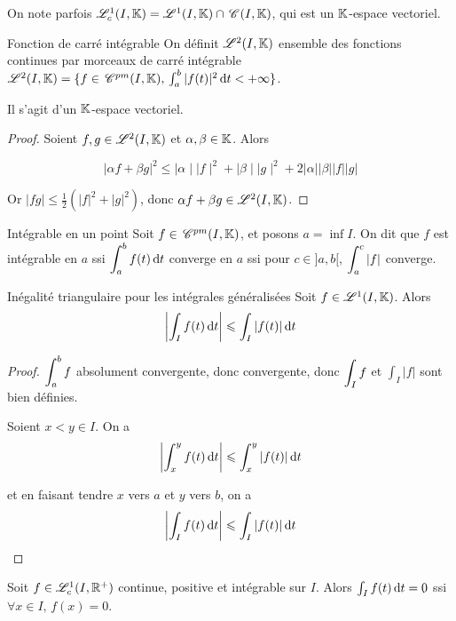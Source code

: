 \begin{remarque}
    On note parfois $\mathscr L^1_c(I, \mathbb{K}) = \mathscr L^1(I, \mathbb{K}) \cap \,\mathscr C^{} (I, \mathbb{K})$, 
    qui est un $\mathbb{K}$-espace vectoriel.
\end{remarque}

\begin{definition}{Fonction de carré intégrable}{}
    On définit $\mathscr L^2(I, \mathbb{K})$ ensemble des fonctions continues par morceaux de carré 
    intégrable $\mathscr L^2(I, \mathbb{K}) = \{f \in \,\mathscr C^{pm}(I, \mathbb{K}), \, \int_a^b |f(t)|^2 \,\mathrm{d}t < + \infty\}$.

    Il s'agit d'un $\mathbb{K}$-espace vectoriel.
\end{definition}

\begin{proof}
    Soient $f, g \in \mathscr L^2(I, \mathbb{K})$ et $\alpha, \beta \in \mathbb{K}$. Alors

    $$|\alpha f + \beta g|^2 \leqslant \mid \alpha \mid \mid f \mid ^2 + \mid \beta \mid \mid g \mid^2 + 2 |\alpha| |\beta| |f| |g| $$

    Or $|fg| \leqslant \frac 1 2 (|f|^2 + |g|^2)$, donc $\alpha f + \beta g \in \mathscr L^2(I, \mathbb{K})$.
\end{proof}

\begin{definition}{Intégrable en un point}{}
    Soit $f \in \,\mathscr C^{pm}(I, \mathbb{K})$, et posons $a = \inf I$. On dit que $f$ est intégrable en 
    $a$ ssi $\displaystyle \int_a^b f(t) \,\mathrm{d}t$ converge en $a$ ssi pour $c \in ]a, b[$, $\displaystyle \int_a^c |f|$ converge.
\end{definition}

\begin{theoreme}{Inégalité triangulaire pour les intégrales généralisées}{}
    Soit $f \in \mathscr L^1(I, \mathbb{K})$. Alors 
    $$\left| \int_I f(t) \,\mathrm{d}t \right| \leqslant \int_I |f(t)| \,\mathrm{d}t$$
\end{theoreme}

\begin{proof}
    $\displaystyle \int_{a }^{b } f$ absolument convergente, donc convergente, donc 
    $\displaystyle \int_I f$ et $\int_I |f|$ sont bien définies.

    \avspace Soient $x < y \in I$. On a 
    $$\left| \int_x^y f(t) \,\mathrm{d}t \right| \leqslant \int_x^y |f(t)| \,\mathrm{d}t$$

    et en faisant tendre $x$ vers $a$ et $y$ vers $b$, on a
    $$\left| \int_I f(t) \,\mathrm{d}t \right| \leqslant \int_I |f(t)| \,\mathrm{d}t$$
\end{proof}


\begin{proposition}{}{}
    Soit $f \in \mathscr L^1_c (I, \mathbb{R}^+)$ continue, positive et intégrable sur $I$. 
    Alors $\int_I f(t) \,\mathrm{d}t =0$ ssi $\forall x \in I, \, f(x) = 0$.
\end{proposition}


